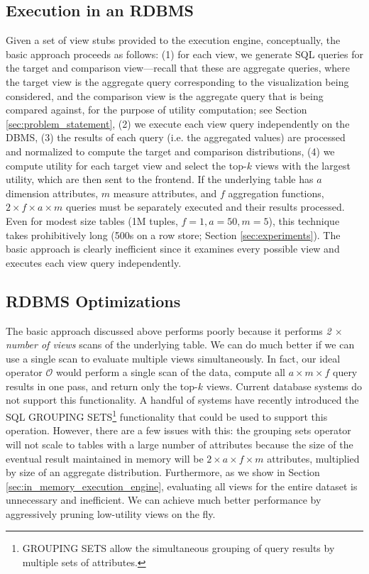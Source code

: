 \subsection{Execution in an RDBMS}
\label{sec:basic_framework}
Given a set of view stubs provided to the execution engine, conceptually,
the basic approach proceeds as follows:
(1) for each view, we generate SQL queries for the target and
comparison view---recall that these are aggregate queries, where
the target view is the aggregate query corresponding 
to the visualization being considered, and the comparison
view is the aggregate query that is being compared against,
for the purpose of utility computation;
see Section \ref{sec:problem_statement}, 
(2) we execute each view query independently on the DBMS, 
(3) the results of each query (i.e. the aggregated values) are processed and
normalized to compute the target and comparison distributions, 
(4) we compute utility for each target view 
and select the top-$k$ views with the largest utility,
which are then sent to the frontend.
If the underlying table has $a$ dimension attributes, $m$ measure attributes,
and $f$ aggregation functions, $2\times f \times a \times  m$ queries must be separately executed and their results
processed. Even for modest size tables (1M tuples, $f = 1, a = 50, m=5$), this
technique takes prohibitively long (500s on a row store; Section
\ref{sec:experiments}).
The basic approach is clearly inefficient since it examines every possible view and executes each view
query independently.

\subsection{RDBMS Optimizations} 
\label{sec:dbms_optimizations}
The basic approach discussed above performs poorly because it performs {\it 2
$\times$ number of views} scans of the underlying table. We can do much better
if we can use a single scan to evaluate multiple views simultaneously.
In fact, our ideal operator $\mathcal{O}$ would perform a single scan of the
data, compute all $a \times m \times f$ query results in one pass, and return
only the top-$k$ views.
Current database systems do not support this functionality.
A handful of systems have recently introduced the SQL GROUPING
SETS\footnote{GROUPING SETS allow the simultaneous grouping of query results by
multiple sets of attributes.} functionality that could be used to support this
operation. However, there are a few issues with this: the grouping sets
operator will not scale to tables with a large number of attributes because the 
size of the eventual result maintained in memory will be $2 \times a \times f
\times m$ attributes, multiplied by size of an aggregate distribution.
Furthermore, as we show in Section \ref{sec:in_memory_execution_engine},
evaluating all views for the entire dataset is unnecessary and inefficient. 
We can achieve much better performance by aggressively pruning low-utility
views on the fly.

